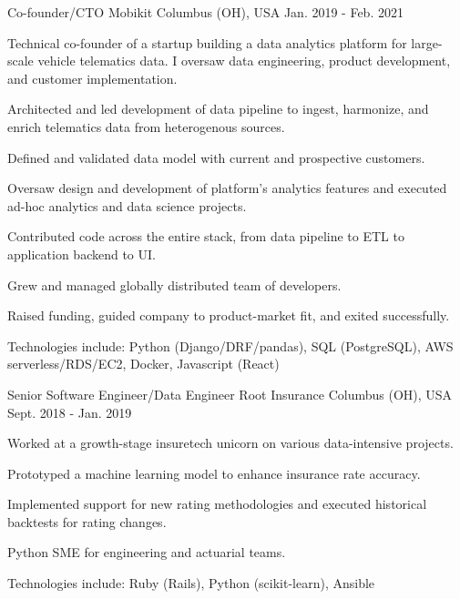\begin{cventries}
  \cventry
    {Co-founder/CTO} %
    {Mobikit} %
    {Columbus (OH), USA} %
    {Jan. 2019 - Feb. 2021} %
    {
      Technical co-founder of a startup building a data analytics platform for large-scale vehicle telematics data. I oversaw data engineering, product development, and customer implementation.
      \vspace{5.0mm}
      \begin{cvitems} %
        \item {Architected and led development of data pipeline to ingest, harmonize, and enrich telematics data from heterogenous sources.}
        \item {Defined and validated data model with current and prospective customers.}
        \item {Oversaw design and development of platform's analytics features and executed ad-hoc analytics and data science projects.}
        \item {Contributed code across the entire stack, from data pipeline to ETL to application backend to UI.}
        \item {Grew and managed globally distributed team of developers.}
        \item {Raised funding, guided company to product-market fit, and exited successfully.}
        \item {Technologies include: Python (Django/DRF/pandas), SQL (PostgreSQL), AWS serverless/RDS/EC2, Docker, Javascript (React)}
      \end{cvitems}
    }

  \cventry
    {Senior Software Engineer/Data Engineer} %
    {Root Insurance} %
    {Columbus (OH), USA} %
    {Sept. 2018 - Jan. 2019} %
    {
      Worked at a growth-stage insuretech unicorn on various data-intensive projects.
      \vspace{5.0mm}
      \begin{cvitems} %
        \item {Prototyped a machine learning model to enhance insurance rate accuracy.}
        \item {Implemented support for new rating methodologies and executed historical backtests for rating changes.}
        \item {Python SME for engineering and actuarial teams.}
        \item {Technologies include: Ruby (Rails), Python (scikit-learn), Ansible}
      \end{cvitems}
    }


\end{cventries}
